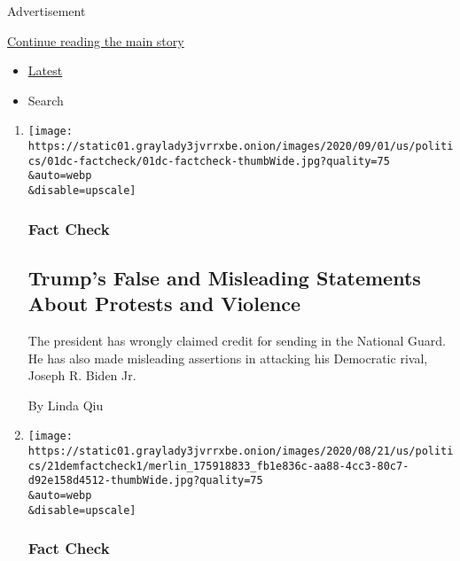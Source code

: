 Advertisement

\protect\hyperlink{after-subheader}{Continue reading the main story}

\begin{itemize}
\tightlist
\item
  \protect\hyperlink{stream-panel}{Latest}
\item
  Search
\end{itemize}

\begin{enumerate}
\def\labelenumi{\arabic{enumi}.}
\item
  \href{/2020/09/01/us/politics/trump-fact-check-protests.html}{}

  \texttt{[image: https://static01.graylady3jvrrxbe.onion/images/2020/09/01/us/politics/01dc-factcheck/01dc-factcheck-thumbWide.jpg?quality=75\\\&auto=webp\\\&disable=upscale]}

  \hypertarget{fact-check}{%
  \subsubsection{Fact Check}\label{fact-check}}

  \hypertarget{trumps-false-and-misleading-statements-about-protests-and-violence}{%
  \subsection{Trump's False and Misleading Statements About Protests and
  Violence}\label{trumps-false-and-misleading-statements-about-protests-and-violence}}

  The president has wrongly claimed credit for sending in the National
  Guard. He has also made misleading assertions in attacking his
  Democratic rival, Joseph R. Biden Jr.

  By Linda Qiu
\item
  \href{/2020/08/21/us/politics/fact-check-democrats.html}{}

  \texttt{[image: https://static01.graylady3jvrrxbe.onion/images/2020/08/21/us/politics/21demfactcheck1/merlin\_175918833\_fb1e836c-aa88-4cc3-80c7-d92e158d4512-thumbWide.jpg?quality=75\\\&auto=webp\\\&disable=upscale]}

  \hypertarget{fact-check-1}{%
  \subsubsection{Fact Check}\label{fact-check-1}}

  \hypertarget{fact-checking-the-democratic-national-convention}{%
}
\end{enumerate}
